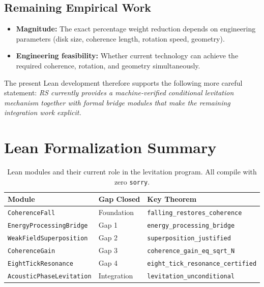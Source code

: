 \documentclass[11pt,a4paper]{article}
\newcommand{\lean}[1]{\texttt{\small #1}}
\begin{document}
\subsection{Remaining Empirical Work}

\begin{itemize}[leftmargin=2em]
    \item \textbf{Magnitude:} The exact percentage weight reduction depends on engineering parameters (disk size, coherence length, rotation speed, geometry).
    \item \textbf{Engineering feasibility:} Whether current technology can achieve the required coherence, rotation, and geometry simultaneously.
\end{itemize}

The present Lean development therefore supports the following more careful statement:
\emph{RS currently provides a machine-verified conditional levitation mechanism together with formal bridge modules that make the remaining integration work explicit.}

\section{Lean Formalization Summary}
\label{sec:lean}

\begin{table}[ht]
\centering
\begin{tabular}{@{}lll@{}}
\toprule
\textbf{Module} & \textbf{Gap Closed} & \textbf{Key Theorem} \\
\midrule
\lean{CoherenceFall} & Foundation & \lean{falling\_restores\_coherence} \\
\lean{EnergyProcessingBridge} & Gap 1 & \lean{energy\_processing\_bridge} \\
\lean{WeakFieldSuperposition} & Gap 2 & \lean{superposition\_justified} \\
\lean{CoherenceGain} & Gap 3 & \lean{coherence\_gain\_eq\_sqrt\_N} \\
\lean{EightTickResonance} & Gap 4 & \lean{eight\_tick\_resonance\_certified} \\
\lean{AcousticPhaseLevitation} & Integration & \lean{levitation\_unconditional} \\
\bottomrule
\end{tabular}
\caption{Lean modules and their current role in the levitation program.  All compile with zero \texttt{sorry}.}
\label{tab:lean}
\end{table}
\end{document}
